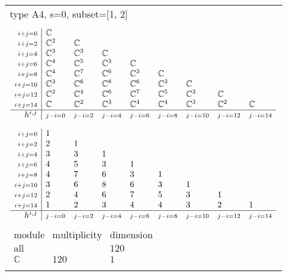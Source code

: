 \documentclass[crop,border=2mm]{standalone}
\begin{document}
\begin{tabular}{l}
{\huge type A4, s=0, subset=[1, 2]}\\ \\


$\displaystyle
\begin{array}{r|l l l l l l l l}
	{\scriptstyle i+j=0}&\mathbb{C}&&&&&&&\\
	{\scriptstyle i+j=2}&\mathbb{C}^{2}&\mathbb{C}&&&&&&\\
	{\scriptstyle i+j=4}&\mathbb{C}^{3}&\mathbb{C}^{3}&\mathbb{C}&&&&&\\
	{\scriptstyle i+j=6}&\mathbb{C}^{4}&\mathbb{C}^{5}&\mathbb{C}^{3}&\mathbb{C}&&&&\\
	{\scriptstyle i+j=8}&\mathbb{C}^{4}&\mathbb{C}^{7}&\mathbb{C}^{6}&\mathbb{C}^{3}&\mathbb{C}&&&\\
	{\scriptstyle i+j=10}&\mathbb{C}^{3}&\mathbb{C}^{6}&\mathbb{C}^{8}&\mathbb{C}^{6}&\mathbb{C}^{3}&\mathbb{C}&&\\
	{\scriptstyle i+j=12}&\mathbb{C}^{2}&\mathbb{C}^{4}&\mathbb{C}^{6}&\mathbb{C}^{7}&\mathbb{C}^{5}&\mathbb{C}^{3}&\mathbb{C}&\\
	{\scriptstyle i+j=14}&\mathbb{C}&\mathbb{C}^{2}&\mathbb{C}^{3}&\mathbb{C}^{4}&\mathbb{C}^{4}&\mathbb{C}^{3}&\mathbb{C}^{2}&\mathbb{C}\\
	\hline h^{i,j}&{\scriptstyle j-i=0}&{\scriptstyle j-i=2}&{\scriptstyle j-i=4}&{\scriptstyle j-i=6}&{\scriptstyle j-i=8}&{\scriptstyle j-i=10}&{\scriptstyle j-i=12}&{\scriptstyle j-i=14}
\end{array}
$ \\ \\


$\displaystyle
\begin{array}{r|l l l l l l l l}
	{\scriptstyle i+j=0}&1&&&&&&&\\
	{\scriptstyle i+j=2}&2&1&&&&&&\\
	{\scriptstyle i+j=4}&3&3&1&&&&&\\
	{\scriptstyle i+j=6}&4&5&3&1&&&&\\
	{\scriptstyle i+j=8}&4&7&6&3&1&&&\\
	{\scriptstyle i+j=10}&3&6&8&6&3&1&&\\
	{\scriptstyle i+j=12}&2&4&6&7&5&3&1&\\
	{\scriptstyle i+j=14}&1&2&3&4&4&3&2&1\\
	\hline h^{i,j}&{\scriptstyle j-i=0}&{\scriptstyle j-i=2}&{\scriptstyle j-i=4}&{\scriptstyle j-i=6}&{\scriptstyle j-i=8}&{\scriptstyle j-i=10}&{\scriptstyle j-i=12}&{\scriptstyle j-i=14}
\end{array}
$ \\ \\


$\displaystyle
\begin{array}{rll}
	\text{module}&\text{multiplicity}&\text{dimension} \\ \hline \text{all}&&120 \\
	\mathbb{C}&120&1
\end{array}
$ \\ \\

\end{tabular}
\end{document}
